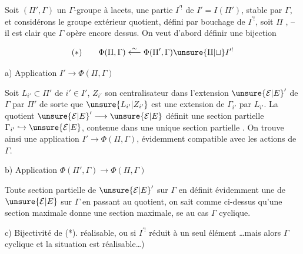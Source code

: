 Soit  $(\Pi',\Gamma)$ un $\Gamma$-groupe 
à lacets,   une partie
$I^{\prime!}$ de $I'=I(\Pi')$, stable par $\Gamma$,
et considérons le groupe extérieur quotient, défini par bouchage de $I^{\prime!}$,
soit $\Pi$ , -- il est clair que $\Gamma$ opère encore dessus.
On veut d'abord définir une bijection

\[
(*)\qquad\Phi(\Pi,\Gamma)\overset{\sim}{\longleftarrow}
\Phi(\Pi',\Gamma)\unsure{\amalg|\sqcup} I^{\prime!}
\]

a) Application $I'\longrightarrow\Phi(\Pi,\Gamma)$

Soit $L_{i'}\subset\Pi'$ de  $i'\in I'$, $Z_{i'}$ son centralisateur dans l'extension $\unsure{\mathcal E|E}'$ de $\Gamma$ par $\Pi'$
de sorte que $\unsure{L_{i'}|Z_{i'}}$ est une extension de $\Gamma_{i'}$
par $L_{i'}$. La  quotient $\unsure{\mathcal E|E}'\longrightarrow\unsure{\mathcal E|E}$
définit une section partielle $\Gamma_{i'}\hookrightarrow\unsure{\mathcal E|E}$,
contenue dans une unique section partielle 
.
On trouve ainsi une application $I'\longrightarrow\Phi(\Pi,\Gamma)$,
évidemment compatible avec les actions de $\Gamma$.

b) Application $\Phi(\Pi',\Gamma)\longrightarrow\Phi(\Pi,\Gamma)$

Toute section partielle  de $\unsure{\mathcal E|E}'$ sur $\Gamma$ en définit
évidemment une de $\unsure{\mathcal E|E}$ sur $\Gamma$ en passant au
quotient, on sait comme ci-dessus qu'une
section maximale donne une section maximale,
 se  au cas $\Gamma$ cyclique.

c) Bijectivité de (*).  
réalisable, ou si $I^{\prime!}$ réduit à un seul élément
\ldots mais alors $\Gamma$ cyclique et la situation est réalisable\ldots)
